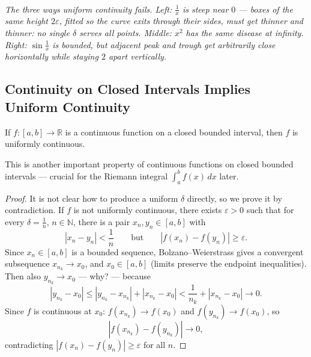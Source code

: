 \documentclass[11pt]{report}
\newcommand{\figcap}[1]{\\[1.5mm]\parbox{0.92\textwidth}{\small\itshape #1}}
\begin{document}
\begin{center}
\figcap{The three ways uniform continuity fails. Left: $\tfrac1x$ is steep near $0$ --- boxes of the \emph{same} height $2\varepsilon$, fitted so the curve exits through their sides, must get thinner and thinner: no single $\delta$ serves all points. Middle: $x^2$ has the same disease at infinity. Right: $\sin\tfrac1x$ is bounded, but adjacent peak and trough get arbitrarily close horizontally while staying $2$ apart vertically.}
\end{center}


\subsection{Continuity on Closed Intervals Implies Uniform Continuity}

\begin{thmbox}
If $f: [a,b] \to \mathbb{R}$ is a continuous function on a closed bounded interval, then $f$ is uniformly continuous.
\end{thmbox}

This is another important property of continuous functions on closed bounded intervals --- crucial for the Riemann integral $\int_a^b f(x)\,dx$ later.

\begin{proof}
It is not clear how to produce a uniform $\delta$ directly, so we prove it by contradiction. If $f$ is not uniformly continuous, there exists $\varepsilon > 0$ such that for every $\delta = \tfrac1n$, $n \in \mathbb{N}$, there is a pair $x_n, y_n \in [a,b]$ with
\[
|x_n - y_n| < \frac1n \qquad \text{but} \qquad |f(x_n) - f(y_n)| \geq \varepsilon.
\]
Since $x_n \in [a,b]$ is a bounded sequence, Bolzano--Weierstrass gives a convergent subsequence $x_{n_k} \to x_0$, and $x_0 \in [a,b]$ (limits preserve the endpoint inequalities). Then also $y_{n_k} \to x_0$ --- why? --- because
\[
|y_{n_k} - x_0| \leq |y_{n_k} - x_{n_k}| + |x_{n_k} - x_0| < \frac{1}{n_k} + |x_{n_k} - x_0| \longrightarrow 0.
\]
Since $f$ is continuous at $x_0$: $f(x_{n_k}) \to f(x_0)$ and $f(y_{n_k}) \to f(x_0)$, so
\[
|f(x_{n_k}) - f(y_{n_k})| \longrightarrow 0,
\]
contradicting $|f(x_n) - f(y_n)| \geq \varepsilon$ for all $n$.
\end{proof}
\end{document}
